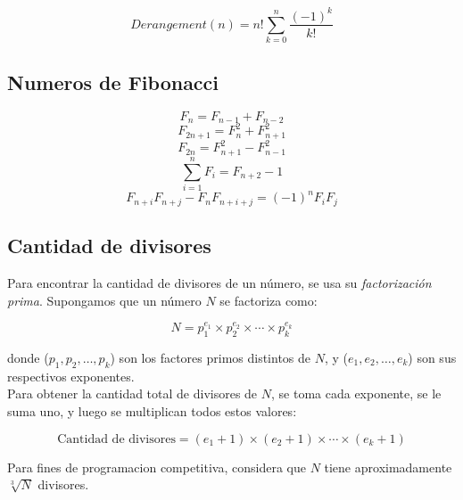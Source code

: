       \begin{equation*}
        Derangement(n) = n! \sum_{k = 0}^n \frac{(-1)^k}{k!}
      \end{equation*}
\subsection{Numeros de Fibonacci}
\begin{equation*}
  F_{n} = F_{n-1}+F_{n-2} 
\end{equation*}
\begin{equation*}
  F_{2n+1} = F_{n}^2 + F_{n+1}^2
\end{equation*}
\begin{equation*}
    F_{2n} = F_{n+1}^2 - F_{n-1}^2
\end{equation*}
\begin{equation*}
    \sum_{i=1}^n F_i = F_{n+2}-1
\end{equation*}
\begin{equation*}
    F_{n+i}F_{n+j} - F_nF_{n+i+j} = (-1)^n F_iF_j
\end{equation*}
\subsection{Cantidad de divisores}
\begin{justify}
Para encontrar la cantidad de divisores de un número, se usa su \textit{factorización prima}. Supongamos que un número $ N$ se factoriza como:
\end{justify}
\begin{equation*}
    N = p_1^{e_1} \times p_2^{e_2} \times \cdots \times p_k^{e_k}
\end{equation*}
\begin{justify}
donde ($p_1, p_2, \dots, p_k$) son los factores primos distintos de $N$, y ($e_1, e_2, \dots, e_k$) son sus respectivos exponentes.
\\
Para obtener la cantidad total de divisores de $N$, se toma cada exponente, se le suma uno, y luego se multiplican todos estos valores:
\end{justify}
\begin{equation*}
    \text{Cantidad de divisores} = (e_1 + 1) \times (e_2 + 1) \times \cdots \times (e_k + 1)
\end{equation*}
\begin{justify}
Para fines de programacion competitiva, considera que $N$ tiene aproximadamente $\sqrt[3]{N}$ divisores.
\end{justify}
